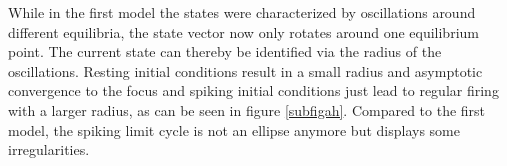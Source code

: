 \documentclass[12pt,a4paper]{article}
\begin{document}
While in the first model the states were characterized by oscillations around different equilibria, the state vector now only rotates around one equilibrium point. The current state can thereby be identified via the radius of the oscillations. Resting initial conditions result in a small radius and asymptotic convergence to the focus and spiking initial conditions just lead to regular firing with a larger radius, as can be seen in figure \ref{subfigah}. Compared to the first model, the spiking limit cycle is not an ellipse anymore but displays some irregularities.
\begin{figure}[H]

\end{figure}
\end{document}
